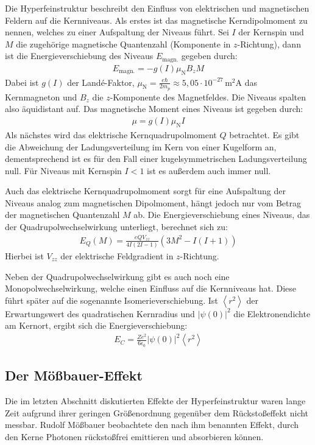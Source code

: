 	Die Hyperfeinstruktur beschreibt den Einfluss von elektrischen und magnetischen Feldern auf die Kernniveaus. Als erstes ist das magnetische Kerndipolmoment zu nennen, welches zu einer Aufspaltung der Niveaus führt. Sei $I$ der Kernspin und $M$ die zugehörige magnetische Quantenzahl (Komponente in $z$-Richtung), dann ist die Energieverschiebung des Niveaus $E_\text{magn.}$ gegeben durch:
	\begin{align}
		E_\text{magn.}=-g(I)\mu_\text{N}B_z M
	\end{align}
	Dabei ist $g(I)$ der Land\'{e}-Faktor, $\mu_\text{N}=\frac{e\hbar}{2m_p}\approx 5,05\cdot 10^{-27}\,$m$^2$A das Kernmagneton und $B_z$ die $z$-Komponente des Magnetfeldes. Die Niveaus spalten also äquidistant auf. Das magnetische Moment eines Niveaus ist gegeben durch:
	\begin{align}
		\mu = g(I)\mu_\text{N}I
	\end{align}
	Als nächstes wird das elektrische Kernquadrupolmoment $Q$ betrachtet. Es gibt die Abweichung der Ladungsverteilung im Kern von einer Kugelform an, dementsprechend ist es für den Fall einer kugelsymmetrischen Ladungsverteilung null. Für Niveaus mit Kernspin $I<1$ ist es außerdem auch immer null. 
	
	Auch das elektrische Kernquadrupolmoment sorgt für eine Aufspaltung der Niveaus analog zum magnetischen Dipolmoment, hängt jedoch nur vom Betrag der magnetischen Quantenzahl $M$ ab. Die Energieverschiebung eines Niveaus, das der Quadrupolwechselwirkung unterliegt, berechnet sich zu:
	\begin{align}
		E_Q(M)=\frac{eQV_{zz}}{4I(2I-1)}\left( 3M^2 - I(I+1)\right) 
	\end{align}
	Hierbei ist $V_{zz}$ der elektrische Feldgradient in $z$-Richtung.
	
	Neben der Quadrupolwechselwirkung gibt es auch noch eine Monopolwechselwirkung, welche einen Einfluss auf die Kernniveaus hat. Diese führt später auf die sogenannte Isomerieverschiebung. Ist $\left\langle r^2\right\rangle $ der Erwartungswert des quadratischen Kernradius und $\left| \psi(0)\right|^2$ die Elektronendichte am Kernort, ergibt sich die Energieverschiebung:
	\begin{align}
		E_C = \frac{Ze^2}{6\epsilon_0}\left| \psi(0)\right|^2\left\langle r^2\right\rangle \label{eq:monopol}
	\end{align}
	
	\subsection{Der Mößbauer-Effekt}
	Die im letzten Abschnitt diskutierten Effekte der Hyperfeinstruktur waren lange Zeit aufgrund ihrer geringen Größenordnung gegenüber dem Rückstoßeffekt nicht messbar. Rudolf Mößbauer beobachtete den nach ihm benannten Effekt, durch den Kerne Photonen rückstoßfrei emittieren und absorbieren können. 
	
